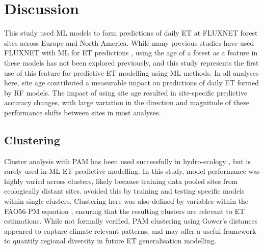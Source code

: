 \section{Discussion}
This study used ML models to form predictions of daily ET at FLUXNET forest sites across Europe and North America. While many previous studies have used FLUXNET with ML for ET predictions \parencite{jung2010recent,besnard2018,wang2022recent}, using the age of a forest as a feature in these models has not been explored previously, and this study represents the first use of this feature for predictive ET modelling using ML methods. In all analyses here, site age contributed a measurable impact on predictions of daily ET formed by RF models. The impact of using site age resulted in site-specific predictive accuracy changes, with large variation in the direction and magnitude of these performance shifts between sites in most analyses. 

\subsection{Clustering}
\par Cluster analysis with \ac{PAM} has been used successfully in hydro-ecology \parencite{hou2025site, e2025multivariate}, but is rarely used in ML ET predictive modelling. In this study, model performance was highly varied across clusters, likely because training data pooled sites from ecologically distant sites. \textcite{ferreira2022exploring} avoided this by training and testing specific models within single clusters. Clustering here was also defined by variables within the FAO56-PM equation \parencite{allen2006recommendation}, ensuring that the resulting clusters are relevant to ET estimations. While not formally verified, \ac{PAM} clustering using Gower's distances appeared to capture climate-relevant patterns, and may offer a useful framework to quantify regional diversity in future ET generalisation modelling. 

